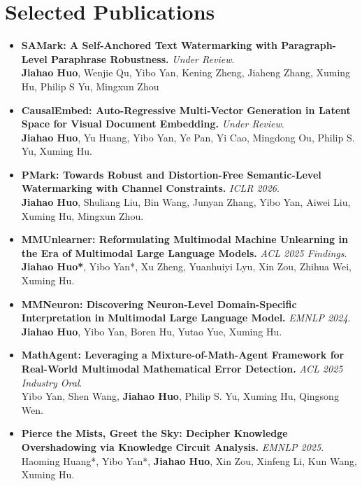\documentclass[letterpaper,10pt]{article}
\begin{document}
\section{Selected Publications}
\begin{itemize}[leftmargin=0.15in, itemsep=1pt, parsep=0pt]
  \small
  \item \textbf{SAMark: A Self-Anchored Text Watermarking with Paragraph-Level Paraphrase Robustness.} \emph{Under Review}. \\
  \textbf{Jiahao Huo}, Wenjie Qu, Yibo Yan, Kening Zheng, Jiaheng Zhang, Xuming Hu, Philip S Yu, Mingxun Zhou
  
  \item \textbf{CausalEmbed: Auto-Regressive Multi-Vector Generation in Latent Space for Visual Document Embedding.} \emph{Under Review}. \\
  \textbf{Jiahao Huo}, Yu Huang, Yibo Yan, Ye Pan, Yi Cao, Mingdong Ou, Philip S. Yu, Xuming Hu.

  \item \textbf{PMark: Towards Robust and Distortion-Free Semantic-Level Watermarking with Channel Constraints.} \emph{ICLR 2026}. \\
  \textbf{Jiahao Huo}, Shuliang Liu, Bin Wang, Junyan Zhang, Yibo Yan, Aiwei Liu, Xuming Hu, Mingxun Zhou.

  \item \textbf{MMUnlearner: Reformulating Multimodal Machine Unlearning in the Era of Multimodal Large Language Models.} \emph{ACL 2025 Findings}. \\
  \textbf{Jiahao Huo*}, Yibo Yan*, Xu Zheng, Yuanhuiyi Lyu, Xin Zou, Zhihua Wei, Xuming Hu.

  \item \textbf{MMNeuron: Discovering Neuron-Level Domain-Specific Interpretation in Multimodal Large Language Model.} \emph{EMNLP 2024}. \\
  \textbf{Jiahao Huo}, Yibo Yan, Boren Hu, Yutao Yue, Xuming Hu.

  \item \textbf{MathAgent: Leveraging a Mixture-of-Math-Agent Framework for Real-World Multimodal Mathematical Error Detection.} \emph{ACL 2025 Industry Oral}. \\
  Yibo Yan, Shen Wang, \textbf{Jiahao Huo}, Philip S. Yu, Xuming Hu, Qingsong Wen.

  \item \textbf{Pierce the Mists, Greet the Sky: Decipher Knowledge Overshadowing via Knowledge Circuit Analysis.} \emph{EMNLP 2025}. \\
  Haoming Huang*, Yibo Yan*, \textbf{Jiahao Huo}, Xin Zou, Xinfeng Li, Kun Wang, Xuming Hu.





\end{itemize}
\end{document}
